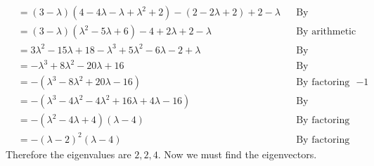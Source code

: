 \documentclass[10pt,letterpaper,final]{report}
\newcommand{\reason}[1]{&& \text{#1}}
\begin{document}
\begin{enumerate}[label=(\alph*)]
\begin{align*}
                              & = (3 - \lambda)(4 - 4\lambda - \lambda + \lambda^2 + 2) - (2 - 2\lambda + 2) + 2 - \lambda \reason{By expansion, arithmetic}                                               \\[1ex]
                              & = (3 - \lambda)(\lambda^2 - 5\lambda + 6) - 4 + 2\lambda + 2 - \lambda \reason{By arithmetic}                                                                              \\[1ex]
                              & = 3\lambda^2 - 15\lambda + 18 - \lambda^3 + 5\lambda^2 - 6\lambda - 2 + \lambda \reason{By expansion, arithmetic}                                                          \\[1ex]
                              & = -\lambda^3 + 8\lambda^2 - 20\lambda + 16 \reason{By simplification}                                                                                                      \\[1ex]
                              & = -(\lambda^3 - 8\lambda^2 + 20\lambda - 16) \reason{By factoring out $-1$}                                                                                                \\[1ex]
                              & = -(\lambda^3 - 4\lambda^2 - 4\lambda^2 + 16\lambda + 4\lambda - 16) \reason{By reorganizing terms}                                                                        \\[1ex]
                              & = -(\lambda^2 - 4\lambda + 4)(\lambda - 4) \reason{By factoring}                                                                                                           \\[1ex]
                              & = -(\lambda - 2)^2(\lambda - 4) \reason{By factoring}
        \end{align*}
        Therefore the eigenvalues are $2, 2, 4$. Now we must find the eigenvectors.


\end{enumerate}
\end{document}
